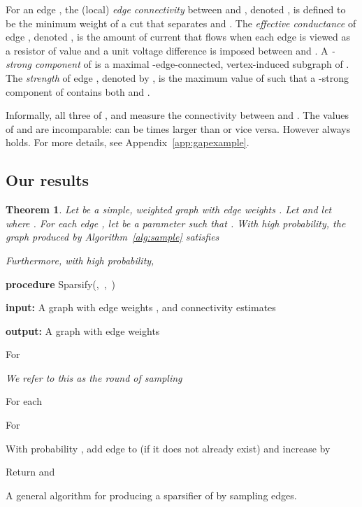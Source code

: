 \documentclass[11pt]{article}
\numberwithin{equation}{section}
\newenvironment{alg}{
    \begin{list}{}{
        \setlength{\itemsep}{2pt}
        \setlength{\parsep}{0pt}
        \setlength{\parskip}{0pt}
        \setlength{\topsep}{1pt}
    }
}
{
    \end{list}
}
\newtheorem{theorem}{Theorem}[section]
\newcommand{\newterm}[1]{\textit{#1}}
\newcommand{\AlgorithmName}[1]{\label{alg:#1}}
\newcommand{\Algorithm}[1]{Algorithm~\ref{alg:#1}}
\newcommand{\Appendix}[1]{Appendix~\ref{app:#1}}
\newcommand{\TheoremName}[1]{\label{thm:#1}}
\begin{document}
For an edge , the (local) \newterm{edge connectivity} between  and ,
denoted , is defined to be the minimum weight of a cut that separates  and .
The \newterm{effective conductance} of edge , denoted ,
is the amount of current that flows when 
each edge  is viewed as a resistor of value 
and a unit voltage difference is imposed between  and .
A \newterm{-strong component} of  is a maximal -edge-connected,
vertex-induced subgraph of .
The \newterm{strength} of edge , denoted by , is
the maximum value of  such that a -strong component of  contains both  and .

Informally, all three of ,  and 
measure the connectivity between  and .
The values of  and  are incomparable:
 can be  times larger than  or vice versa.
However  always holds.
For more details, see \Appendix{gapexample}.



\subsection{Our results}


\begin{theorem}
\TheoremName{mainthm}
Let  be a simple, weighted graph with edge weights .
Let  and let  where .
For each edge , let  be a parameter such that .
With high probability,
the graph  produced by \Algorithm{sample} satisfies

Furthermore, with high probability,

\end{theorem}

\begin{algorithm}
\begin{alg}
\item	\textbf{procedure} Sparsify(,\, ,\, )
\item	\textbf{input:} A graph 
        with edge weights ,
        and connectivity estimates 
\item	\textbf{output:} A graph  with edge weights 
\item   For 
    \begin{alg}
    \item    \textit{We refer to this as the  round of sampling}
    \item   For each 
        \begin{alg}
        \item   For 
            \begin{alg}
            \item   With probability , add edge  to 
                    (if it does not already exist) and increase  by 
            \end{alg}
        \end{alg}
    \end{alg}
\item   Return  and 
\end{alg}
\caption{A general algorithm for producing a sparsifier of  by sampling edges.}
\AlgorithmName{sample}
\end{algorithm}
\end{document}
